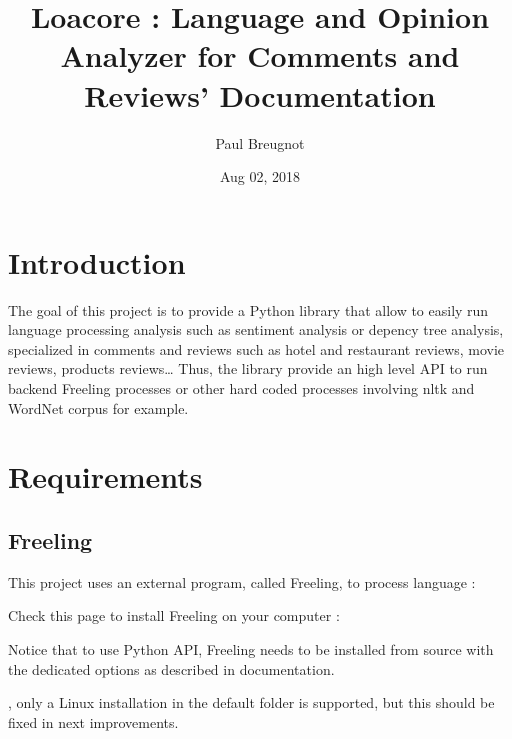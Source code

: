\documentclass[letterpaper,10pt,english]{sphinxmanual}
\title{Loacore : Language and Opinion Analyzer for Comments and Reviews' Documentation}
\date{Aug 02, 2018}
\author{Paul Breugnot}
\begin{document}
\maketitle
\sphinxtableofcontents
{}\label{\detokenize{index::doc}}



\chapter{Introduction}
\label{\detokenize{introduction:introduction}}\label{\detokenize{introduction::doc}}

The goal of this project is to provide a Python library that allow to easily run language processing analysis such as sentiment analysis or depency tree analysis, specialized in comments and reviews such as hotel and restaurant reviews, movie reviews, products reviews… Thus, the library provide an high level API to run backend Freeling processes or other hard coded processes involving nltk and WordNet corpus for example.



\chapter{Requirements}
\label{\detokenize{requirements:requirements}}\label{\detokenize{requirements::doc}}

\section{Freeling}
\label{\detokenize{requirements:freeling}}
\begin{DUlineblock}{0em}
\item[] This project uses an external program, called Freeling, to process language : 
\item[] Check this page to install Freeling on your computer : 
\item[] Notice that to use Python API, Freeling needs to be installed from source with the dedicated options as described in documentation.
\item[] , only a Linux installation in the default folder  is supported, but this should be fixed in next improvements.
\end{DUlineblock}
\end{document}
